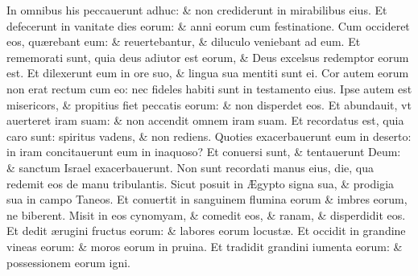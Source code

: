 \documentclass[a5paper,10pt]{book}
\def\ae{æ}
\def\AE{Æ}
\begin{document}
\begin{multicols*}{2}
\newline \color{red} I\color{black}n omnibus his peccauerunt adhuc: \& non crediderunt in mirabilibus eius.
\newline \color{red} E\color{black}t defecerunt in vanitate dies eorum: \& anni eorum cum festinatione.
\newline \color{red} C\color{black}um occideret eos, qu\ae rebant eum: \& reuertebantur, \& diluculo veniebant ad eum.
\newline \color{red} E\color{black}t rememorati sunt, quia deus adiutor est eorum, \& Deus excelsus redemptor eorum est.
\newline \color{red} E\color{black}t dilexerunt eum in ore suo, \& lingua sua mentiti sunt ei.
\newline \color{red} C\color{black}or autem eorum non erat rectum cum eo: nec fideles habiti sunt in testamento eius.
\newline \color{red} I\color{black}pse autem est misericors, \& propitius fiet peccatis eorum: \& non disperdet eos.
\newline \color{red} E\color{black}t abundauit, vt auerteret iram suam: \& non accendit omnem iram suam.
\newline \color{red} E\color{black}t recordatus est, quia caro sunt: spiritus vadens, \& non rediens.
\newline \color{red} Q\color{black}uoties exacerbauerunt eum in deserto: in iram concitauerunt eum in inaquoso?
\newline \color{red} E\color{black}t conuersi sunt, \& tentauerunt Deum: \& sanctum Israel exacerbauerunt.
\newline \color{red} N\color{black}on sunt recordati manus eius, die, qua redemit eos de manu tribulantis.
\newline \color{red} S\color{black}icut posuit in \AE gypto signa sua, \& prodigia sua in campo Taneos.
\newline \color{red} E\color{black}t conuertit in sanguinem flumina eorum \& imbres eorum, ne biberent.
\newline \color{red} M\color{black}isit in eos cynomyam, \& comedit eos, \& ranam, \& disperdidit eos.
\newline \color{red} E\color{black}t dedit \ae rugini fructus eorum: \& labores eorum locust\ae .
\newline \color{red} E\color{black}t occidit in grandine vineas eorum: \& moros eorum in pruina.
\newline \color{red} E\color{black}t tradidit grandini iumenta eorum: \& possessionem eorum igni.

\end{multicols*}
\end{document}
